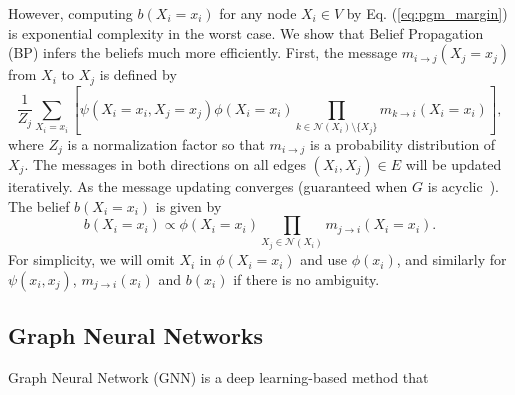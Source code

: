 However, computing $b(X_i=x_i)$ for any node $X_i \in V$ by Eq. (\ref{eq:pgm_margin}) is exponential complexity in the worst case. 
We show that Belief Propagation (BP) \cite{bishop2006pattern} infers the beliefs much more efficiently. 
First, the message $m_{i\to j}(X_j=x_j)$ from $X_i$ to $X_j$ is defined by
\begin{equation}
\label{eq:pgm_sum_prod}
\frac{1}{Z_j}\sum_{X_i=x_i}
\left[\psi(X_i=x_i, X_j=x_j)\phi(X_i=x_i) \prod_{k\in \mathcal{N}(X_i)\setminus \{X_j\}} m_{k\to i}(X_i=x_i)\right],
\end{equation}
where $Z_j$ is a normalization factor so that $m_{i\to j}$ is a probability distribution of $X_j$.
The messages in both directions on all edges $(X_i, X_j) \in E$ will be updated iteratively. 
As the message updating converges (guaranteed when $G$ is acyclic~\cite{pearl1988probabilistic}).
The belief $b(X_i=x_i)$ is given by
\begin{equation}
\label{eq:pgm_belief}
    b(X_i=x_i) \propto \phi(X_i=x_i)\prod_{X_j\in \mathcal{N}(X_i)} m_{j\to i}(X_i=x_i).
\end{equation}
For simplicity, we will omit $X_i$ in $\phi(X_i=x_i)$ and use $\phi(x_i)$, and similarly for $\psi(x_i,x_j)$, $m_{j\to i}(x_i)$ and $b(x_i)$ if there is no ambiguity.

\subsection{Graph Neural Networks}
Graph Neural Network (GNN) is a deep learning-based method that 